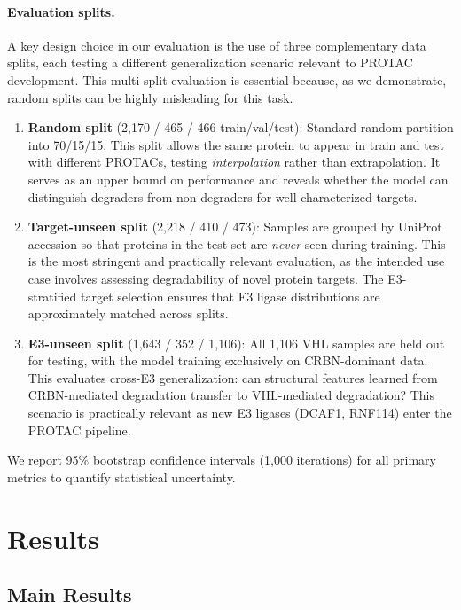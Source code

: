 \documentclass[sigconf]{acmart}
\begin{document}
\paragraph{Evaluation splits.}
A key design choice in our evaluation is the use of three complementary data splits, each testing a different generalization scenario relevant to PROTAC development.
This multi-split evaluation is essential because, as we demonstrate, random splits can be highly misleading for this task.
\begin{enumerate}
    \item \textbf{Random split} (2,170 / 465 / 466 train/val/test): Standard random partition into 70/15/15. This split allows the same protein to appear in train and test with different PROTACs, testing \emph{interpolation} rather than extrapolation. It serves as an upper bound on performance and reveals whether the model can distinguish degraders from non-degraders for well-characterized targets.
    \item \textbf{Target-unseen split} (2,218 / 410 / 473): Samples are grouped by UniProt accession so that proteins in the test set are \emph{never} seen during training. This is the most stringent and practically relevant evaluation, as the intended use case involves assessing degradability of novel protein targets. The E3-stratified target selection ensures that E3 ligase distributions are approximately matched across splits.
    \item \textbf{E3-unseen split} (1,643 / 352 / 1,106): All 1,106 VHL samples are held out for testing, with the model training exclusively on CRBN-dominant data. This evaluates cross-E3 generalization: can structural features learned from CRBN-mediated degradation transfer to VHL-mediated degradation? This scenario is practically relevant as new E3 ligases (DCAF1, RNF114) enter the PROTAC pipeline.
\end{enumerate}
We report 95\% bootstrap confidence intervals (1,000 iterations) for all primary metrics to quantify statistical uncertainty.



\FloatBarrier
\section{Results}

\subsection{Main Results}
\end{document}

